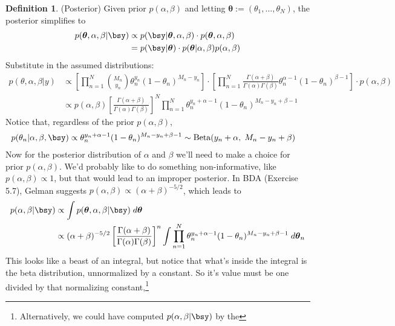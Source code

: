 \documentclass[12pt]{article}
\theoremstyle{plain}
\theoremstyle{definition}
\newtheorem{defn}[thm]{Definition}
\theoremstyle{remark}
\newcommand{\bstheta}{\boldsymbol{\theta}}
\begin{document}
\begin{defn}(Posterior)
Given prior $p(\alpha,\beta)$ and letting
$\bstheta:=(\theta_1,\ldots,\theta_N)$, the posterior simplifies to
\begin{align*}
   p(\bstheta, \alpha, \beta|\bsy)
   &\propto
   p(\bsy|\bstheta, \alpha, \beta) \cdot p(\bstheta, \alpha, \beta)
   \\
   &=
   p(\bsy|\bstheta)\cdot p(\bstheta| \alpha, \beta)p(\alpha,\beta)
\end{align*}
Substitute in the assumed distributions:
\begin{align*}
  p(\theta, \alpha, \beta | y)
  &\propto
  \left[
    \prod^N_{n=1}
    \binom{M_n}{y_n} \theta_n^{y_n}
    (1-\theta_n)^{M_n-y_n}
 \right]
 \cdot
 \left[
   \prod^N_{n=1}
   \frac{\Gamma(\alpha+\beta)}{\Gamma(\alpha) \Gamma(\beta)}
   \theta_n^{\alpha-1} (1-\theta_n)^{\beta-1}
 \right]
 \cdot p(\alpha, \beta)
 \\
  &\propto
  p(\alpha, \beta)
  \left[
    \frac{\Gamma(\alpha+\beta)}{\Gamma(\alpha) \Gamma(\beta)}
  \right]^N
  \prod^N_{n=1}
  \theta_n^{y_n + \alpha -1}
  (1-\theta_n)^{M_n - y_n + \beta - 1}
\end{align*}
Notice that, regardless of the prior $p(\alpha,\beta)$,
\begin{align*}
  p(\theta_n | \alpha, \beta, \bsy)
  &\propto
  \theta_n^{y_n + \alpha -1}
    (1-\theta_n)^{M_n - y_n + \beta - 1}
  \sim
  \text{Beta}(y_n + \alpha, \; M_n - y_n + \beta)
\end{align*}
Now for the posterior distribution of $\alpha$ and $\beta$ we'll need to
make a choice for prior $p(\alpha,\beta)$. We'd probably like to do
something non-informative, like $p(\alpha, \beta)\propto 1$, but that
would lead to an improper posterior.
In BDA (Exercise 5.7), Gelman suggests
$p(\alpha, \beta) \propto (\alpha + \beta)^{-5/2}$, which leads to
\begin{align*}
  p(\alpha, \beta | \bsy)
  &\propto
  \int p(\bstheta, \alpha, \beta |\bsy)\; d\bstheta
  \\
  &\propto
  (\alpha + \beta)^{-5/2}
  \left[\frac{\Gamma(\alpha+\beta)}{\Gamma(\alpha) \Gamma(\beta)}
  \right]^n
  \int \prod^N_{n=1} \theta_n^{y_n + \alpha -1}
	 (1-\theta_n)^{M_n - y_n + \beta - 1} \; d\bstheta_n
\end{align*}
This looks like a beast of an integral, but notice that what's inside
the integral is the beta distribution, unnormalized by a constant. So
it's value must be one divided by that normalizing constant,\footnote{
  Alternatively, we could have computed $p(\alpha, \beta |\bsy)$ by the
}
\end{defn}
\end{document}
